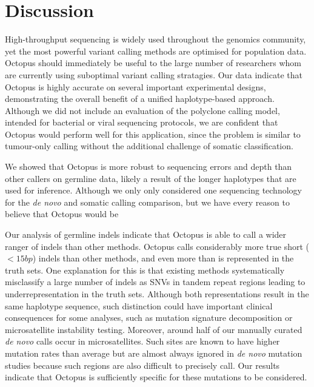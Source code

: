\documentclass[notitlepage, twocolumn]{article}
\begin{document}
\section*{Discussion}

High-throughput sequencing is widely used throughout the genomics community, yet the most powerful variant calling methods are optimised for population data. Octopus should immediately be useful to the large number of researchers whom are currently using suboptimal variant calling stratagies. Our data indicate that Octopus is highly accurate on several important experimental designs, demonstrating the overall benefit of a unified haplotype-based approach. Although we did not include an evaluation of the polyclone calling model, intended for bacterial or viral sequencing protocols, we are confident that Octopus would perform well for this application, since the problem is similar to tumour-only calling without the additional challenge of somatic classification. 

We showed that Octopus is more robust to sequencing errors and depth than other callers on germline data, likely a result of the longer haplotypes that are used for inference. Although we only only considered one sequencing technology for the \textit{de novo} and somatic calling comparison, but we have every reason to believe that Octopus would be  

Our analysis of germline indels indicate that Octopus is able to call a wider ranger of indels than other methods. Octopus calls considerably more true short ($<15bp$) indels than other methods, and even more than is represented in the truth sets. One explanation for this is that existing methods systematically misclassify a large number of indels as SNVs in tandem repeat regions leading to underrepresentation in the truth sets. Although both representations result in the same haplotype sequence, such distinction could have important clinical consequences for some analyses, such as mutation signature decomposition \cite{RN86} or microsatellite instability testing. Moreover, around half of our manually curated \textit{de novo} calls occur in microsatellites. Such sites are known to have higher mutation rates than average but are almost always ignored in \textit{de novo} mutation studies because such regions are also difficult to precisely call. Our results indicate that Octopus is sufficiently specific for these mutations to be considered.
\end{document}
